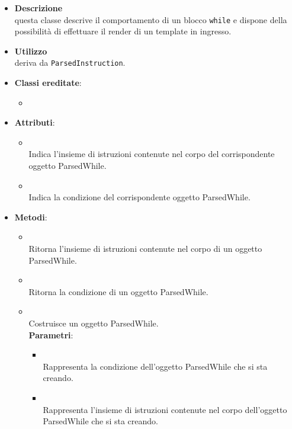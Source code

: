 \begin{itemize}
\item \textbf{Descrizione}\\
questa classe descrive il comportamento di un blocco \texttt{while} e dispone della possibilità di effettuare il render di un template in ingresso.
\item \textbf{Utilizzo}\\
deriva da \texttt{ParsedInstruction}.
\item \textbf{Classi ereditate}:
\begin{itemize}
\item \hyperref[\nogloxy{swedesigner::server::project::ParsedInstruction}]{}
\end{itemize}
\item \textbf{Attributi}:
\begin{itemize}
\item {}
\\ Indica l'insieme di istruzioni contenute nel corpo del corrispondente oggetto ParsedWhile.
\item {}
\\ Indica la condizione del corrispondente oggetto ParsedWhile.
\end{itemize}
\item \textbf{Metodi}:
\begin{itemize}
\item {}
\\ Ritorna l'insieme di istruzioni contenute nel corpo di un oggetto ParsedWhile.
\item {}
\\ Ritorna la condizione di un oggetto ParsedWhile.
\item {}
\\ Costruisce un oggetto ParsedWhile.
\\ \textbf{Parametri}:
\begin{itemize}
\item {}
\\ Rappresenta la condizione dell'oggetto ParsedWhile che si sta creando.
\item {}
\\ Rappresenta l'insieme di istruzioni contenute nel corpo dell'oggetto ParsedWhile che si sta creando.

\end{itemize}
\end{itemize}
\end{itemize}

